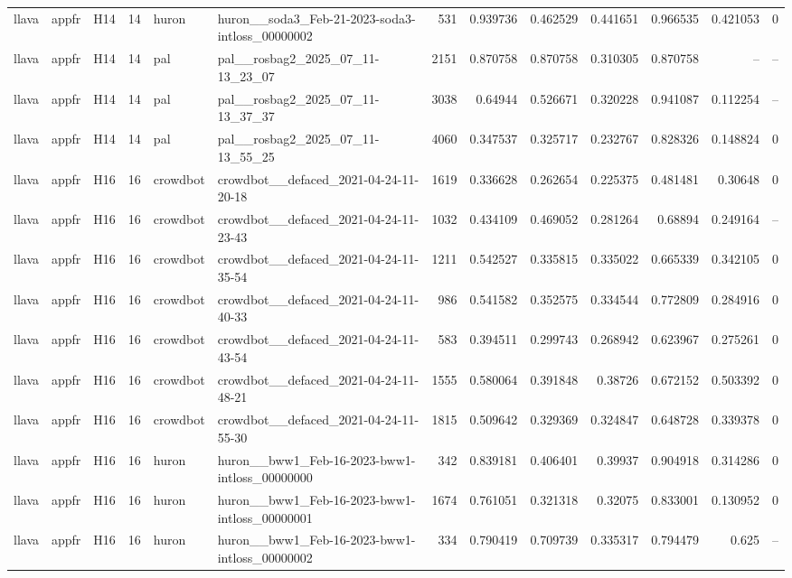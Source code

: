\begin{longtable}{lllrllrrrrrrr}
llava & appfr & H14 & 14 & huron & huron\_\_soda3\_Feb-21-2023-soda3-intloss\_00000002 & 531 & 0.939736 & 0.462529 & 0.441651 & 0.966535 & 0.421053 & 0 \\
llava & appfr & H14 & 14 & pal & pal\_\_rosbag2\_2025\_07\_11-13\_23\_07 & 2151 & 0.870758 & 0.870758 & 0.310305 & 0.870758 & -- & -- \\
llava & appfr & H14 & 14 & pal & pal\_\_rosbag2\_2025\_07\_11-13\_37\_37 & 3038 & 0.64944 & 0.526671 & 0.320228 & 0.941087 & 0.112254 & -- \\
llava & appfr & H14 & 14 & pal & pal\_\_rosbag2\_2025\_07\_11-13\_55\_25 & 4060 & 0.347537 & 0.325717 & 0.232767 & 0.828326 & 0.148824 & 0 \\
llava & appfr & H16 & 16 & crowdbot & crowdbot\_\_defaced\_2021-04-24-11-20-18 & 1619 & 0.336628 & 0.262654 & 0.225375 & 0.481481 & 0.30648 & 0 \\
llava & appfr & H16 & 16 & crowdbot & crowdbot\_\_defaced\_2021-04-24-11-23-43 & 1032 & 0.434109 & 0.469052 & 0.281264 & 0.68894 & 0.249164 & -- \\
llava & appfr & H16 & 16 & crowdbot & crowdbot\_\_defaced\_2021-04-24-11-35-54 & 1211 & 0.542527 & 0.335815 & 0.335022 & 0.665339 & 0.342105 & 0 \\
llava & appfr & H16 & 16 & crowdbot & crowdbot\_\_defaced\_2021-04-24-11-40-33 & 986 & 0.541582 & 0.352575 & 0.334544 & 0.772809 & 0.284916 & 0 \\
llava & appfr & H16 & 16 & crowdbot & crowdbot\_\_defaced\_2021-04-24-11-43-54 & 583 & 0.394511 & 0.299743 & 0.268942 & 0.623967 & 0.275261 & 0 \\
llava & appfr & H16 & 16 & crowdbot & crowdbot\_\_defaced\_2021-04-24-11-48-21 & 1555 & 0.580064 & 0.391848 & 0.38726 & 0.672152 & 0.503392 & 0 \\
llava & appfr & H16 & 16 & crowdbot & crowdbot\_\_defaced\_2021-04-24-11-55-30 & 1815 & 0.509642 & 0.329369 & 0.324847 & 0.648728 & 0.339378 & 0 \\
llava & appfr & H16 & 16 & huron & huron\_\_bww1\_Feb-16-2023-bww1-intloss\_00000000 & 342 & 0.839181 & 0.406401 & 0.39937 & 0.904918 & 0.314286 & 0 \\
llava & appfr & H16 & 16 & huron & huron\_\_bww1\_Feb-16-2023-bww1-intloss\_00000001 & 1674 & 0.761051 & 0.321318 & 0.32075 & 0.833001 & 0.130952 & 0 \\
llava & appfr & H16 & 16 & huron & huron\_\_bww1\_Feb-16-2023-bww1-intloss\_00000002 & 334 & 0.790419 & 0.709739 & 0.335317 & 0.794479 & 0.625 & -- \\

\end{longtable}
